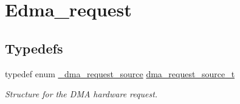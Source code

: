 \hypertarget{group__edma__request}{}\section{Edma\+\_\+request}
\label{group__edma__request}
\subsection*{Typedefs}
\begin{DoxyCompactItemize}
\item 
typedef enum \mbox{\hyperlink{group__edma__request_gafd16b7227cfdebb996c941d293ddd600}{\+\_\+dma\+\_\+request\+\_\+source}} \mbox{\hyperlink{group__edma__request_ga87fac76863c6c941e6363236dde6f58e}{dma\+\_\+request\+\_\+source\+\_\+t}}
\begin{DoxyCompactList}\small\item\em Structure for the D\+MA hardware request. \end{DoxyCompactList}\end{DoxyCompactItemize}
